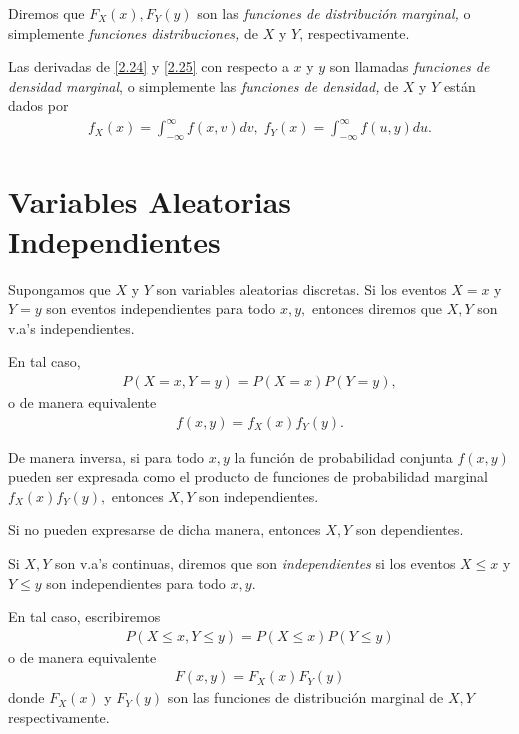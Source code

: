  Diremos que $F_{X}(x),F_{Y}(y)$ son las \emph{funciones de distribución marginal,} o simplemente \emph{funciones distribuciones,} de $X$ y $Y$, respectivamente.


 Las derivadas de \eqref{2.24} y \eqref{2.25} con respecto a $x$ y $y$ son llamadas \emph{funciones de densidad marginal}, o simplemente las \emph{funciones de densidad,} de $X$ y $Y$ están dados por
 \begin{align}
 \label{eq:0.2.26}
 \displaystyle
  f_{X}(x)=\int_{-\infty}^{\infty}f(x,v)dv, \;
  f_{Y}(x)=\int_{-\infty}^{\infty}f(u,y)du.
 \end{align}



\section{Variables Aleatorias Independientes}

 Supongamos que $X$ y $Y$ son variables aleatorias discretas.  Si los eventos $X=x$ y $Y=y$ son eventos independientes para todo $x,y,$  entonces diremos que $X,Y$ son v.a's independientes.


 En tal caso,
 \begin{align}
  \label{eq:0.2.27}
  P(X=x,Y=y)=P(X=x)P(Y=y),
 \end{align}
o de manera equivalente
\begin{align}
 f(x,y)=f_{X}(x)f_{Y}(y).
\end{align}



 De manera inversa, si para todo $x,y$ la función de probabilidad conjunta $f(x,y)$ pueden ser expresada como el producto de funciones de probabilidad marginal $f_{X}(x)f_{Y}(y),$ entonces $X,Y$ son independientes.
 

 Si no pueden expresarse de dicha manera, entonces $X,Y$ son dependientes.


 Si $X,Y$ son v.a's continuas, diremos que son \emph{independientes} si los eventos $X\leq x$ y $Y\leq y$ son independientes para todo $x,y.$

 En tal caso, escribiremos
 \begin{align}
  \label{eq:0.2.29}
  P(X\leq x, Y \leq y)=P(X\leq x)P(Y\leq y)
 \end{align} 
 o de manera equivalente
 \begin{align}
  F(x,y)=F_{X}(x)F_{Y}(y)
 \end{align}
 donde $F_{X}(x)$ y $F_{Y}(y)$ son las funciones de distribución marginal de $X,Y$ respectivamente.



